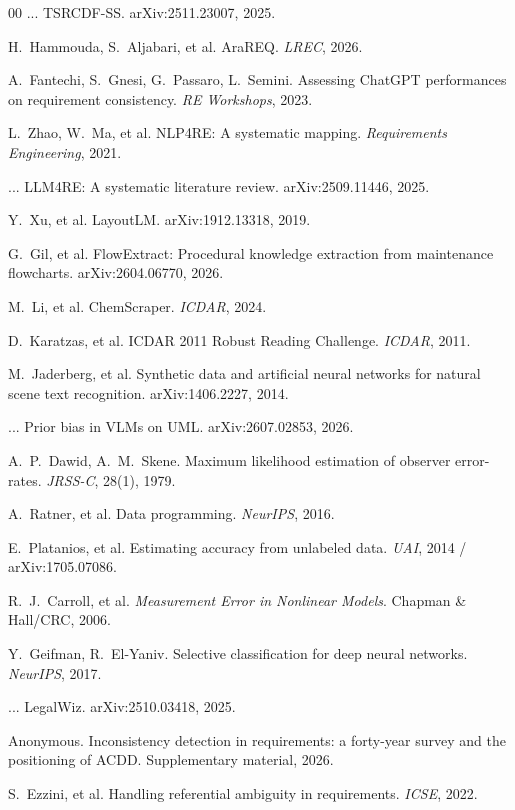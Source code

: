 \documentclass[10pt,twocolumn]{article}
\begin{document}
\begin{thebibliography}{00}
 ... TSRCDF-SS. arXiv:2511.23007, 2025.

 H.~Hammouda, S.~Aljabari, et al.
AraREQ. \emph{LREC}, 2026.

 A.~Fantechi, S.~Gnesi,
G.~Passaro, L.~Semini. Assessing ChatGPT performances on requirement
consistency. \emph{RE Workshops}, 2023.

 L.~Zhao, W.~Ma, et al. NLP4RE: A
systematic mapping. \emph{Requirements Engineering}, 2021.

 ... LLM4RE: A systematic literature
review. arXiv:2509.11446, 2025.

 Y.~Xu, et al. LayoutLM. arXiv:1912.13318,
2019.

 G.~Gil, et al. FlowExtract: Procedural
knowledge extraction from maintenance flowcharts. arXiv:2604.06770,
2026.

 M.~Li, et al. ChemScraper. \emph{ICDAR},
2024.

 D.~Karatzas, et al. ICDAR 2011 Robust
Reading Challenge. \emph{ICDAR}, 2011.

 M.~Jaderberg, et al. Synthetic data
and artificial neural networks for natural scene text recognition.
arXiv:1406.2227, 2014.

 ... Prior bias in VLMs on UML. arXiv:2607.02853, 2026.

 A.~P.~Dawid, A.~M.~Skene. Maximum
likelihood estimation of observer error-rates. \emph{JRSS-C},
28(1), 1979.

 A.~Ratner, et al. Data programming.
\emph{NeurIPS}, 2016.

 E.~Platanios, et al. Estimating
accuracy from unlabeled data. \emph{UAI}, 2014 / arXiv:1705.07086.

 R.~J.~Carroll, et al.
\emph{Measurement Error in Nonlinear Models}. Chapman \& Hall/CRC,
2006.

 Y.~Geifman, R.~El-Yaniv. Selective
classification for deep neural networks. \emph{NeurIPS}, 2017.

 ... LegalWiz. arXiv:2510.03418, 2025.

 Anonymous. Inconsistency detection in
requirements: a forty-year survey and the positioning of ACDD.
Supplementary material, 2026.

 S.~Ezzini, et al. Handling
referential ambiguity in requirements. \emph{ICSE}, 2022.

\end{thebibliography}
\end{document}
